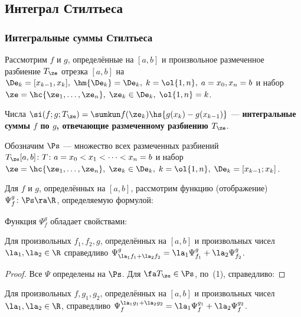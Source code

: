 \documentclass[a4paper]{article}
\begin{document}
\subsection{Интеграл Стилтьеса}

\subsubsection{Интегральные суммы Стилтьеса}

Рассмотрим $f$ и $g$, определённые на $[a,b]$ и произвольное
размеченное разбиение $T_{\ze}$ отрезка $[a,b]$ на
$\De_k=[x_{k-1},x_k],\;\hm{\De_k}=\De_k,\;k=\ol{1,n},\; a =
x_0, x_n = b$ и набор $\ze=\hc{\ze_1,\dots,\ze_n},\;\ze_k\in\De_k,\;
\ol{1,n}=k$.

Числа $\si(f;g;T_{\ze}) = \sumkun f(\ze_k) \hs{g(x_k) - g(x_{k-1})}$
--- \textbf{интегральные суммы $f$ по $g$, отвечающие размеченному разбиению
$T_{\ze}$}.

Обозначим $\Ps$ --- множество всех размеченных разбиений
$T_{\ze}[a,b]\colon T\colon a=x_0 < x_1 < \dots < x_n = b$ и набор
$\ze=\hc{\ze_1,\dots,\ze_n}, \; \ze_k \in \De_k,\;
k=\ol{1,n},\; \De_k = [x_{k-1};x_k]$.

Для $f$ и $g$, определённых на $[a,b]$, рассмотрим функцию
(отображение) $\Psi_f^g\colon \Ps\ra\R$, определяемую формулой:


Функция $\Psi_f^g$ обладает свойствами:

\begin{prop}
Для произвольных $f_1, f_2, g$, определённых на $[a,b]$ и
произвольных чисел $\la_1,\la_2\in\R$ справедливо $\Psi_{\la_1 f_1 +
\la_2 f_2}^g = \la_1 \Psi_{f_1}^g + \la_2 \Psi_{f_2}^g$.
\end{prop}

\begin{proof}
Все $\Psi$ определены на $\Ps$. Для $\fa  T_{\ze} \in \Ps$, по~(1), справедливо:
\end{proof}

\begin{prop}
Для произвольных $f,g_1,g_2$, определённых на $[a,b]$ и произвольных
чисел $\la_1,\la_2\in\R$, справедливо $\Psi_f^{\la_1 g_1 + \la_2
g_2} = \la_1 \Psi_f^{g_1} + \la_2 \Psi_f^{g_2}$.
\end{prop}
\end{document}
